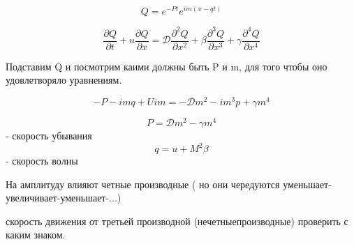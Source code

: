 \documentclass[14pt]{extarticle}
\begin{document}
\[ Q = e^{-P t } e^{im(x-qt)} \]

\[ \frac{\partial Q }{\partial t} + u \frac{\partial Q }{\partial x } = \mathcal{D } \frac{\partial^2 Q }{\partial x^2 } + \beta \frac{\partial^3 Q }{\partial x^3 } + \gamma \frac{\partial^4 Q }{\partial x^4} \]

Подставим Q и посмотрим каими должны быть P и m, для того чтобы оно удовлетворяло уравнениям.

\[ -P - i m q + U i m = - \mathcal{D} m^2 - i m^3 p + \gamma m^4 \]

\[ P = \mathcal{D }m^2 - \gamma m^4 \] - скорость убывания
\[ q = u + M^2 \beta \] - скорость волны

На амплитуду влияют четные производные ( но они чередуются уменьшает-увеличивает-уменьшает-...)

скорость движения от третьей производной (нечетныепроизводные) проверить с каким знаком.
\end{document}
